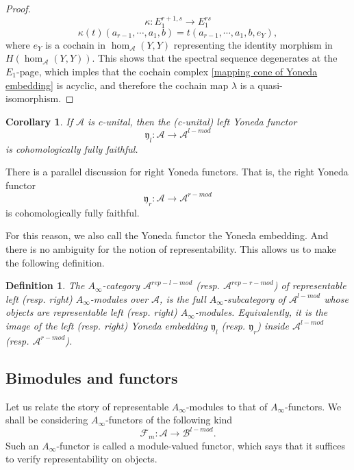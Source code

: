 \documentclass{amsart}
\newtheorem{definition}[theorem]{Definition}
\newtheorem{corollary}[theorem]{Corollary}
\numberwithin{equation}{section}
\numberwithin{figure}{section}
\begin{document}
\begin{proof}
\begin{equation}
\kappa: E_{1}^{r+1, s} \to E_{1}^{rs}
\end{equation}
\begin{equation}
\kappa(t)(a_{r-1}, \cdots, a_{1}, b) = t(a_{r-1}, \cdots, a_{1}, b, e_{Y}),
\end{equation}
where $e_{Y}$ is a cochain in $\hom_{\mathcal{A}}(Y, Y)$ representing the identity morphism in $H(\hom_{\mathcal{A}}(Y, Y))$. This shows that the spectral sequence degenerates at the $E_{1}$-page, which imples that the cochain complex \eqref{mapping cone of Yoneda embedding} is acyclic, and therefore the cochain map $\lambda$ is a quasi-isomorphism.
\end{proof}

\begin{corollary}
	If $\mathcal{A}$ is c-unital, then the (c-unital) left Yoneda functor
\begin{equation*}
\mathfrak{y}_{l}: \mathcal{A} \to \mathcal{A}^{l-mod}
\end{equation*}
is cohomologically fully faithful.
\end{corollary}

	There is a parallel discussion for right Yoneda functors. That is, the right Yoneda functor
\begin{equation*}
\mathfrak{y}_{r}: \mathcal{A} \to \mathcal{A}^{r-mod}
\end{equation*}
is cohomologically fully faithful. \par

	For this reason, we also call the Yoneda functor the Yoneda embedding. And there is no ambiguity for the notion of representability. This allows us to make the following definition. \par

\begin{definition}
	The $A_{\infty}$-category $\mathcal{A}^{rep-l-mod}$ (resp. $\mathcal{A}^{rep-r-mod}$) of representable left (resp. right) $A_{\infty}$-modules over $\mathcal{A}$, is the full $A_{\infty}$-subcategory of $\mathcal{A}^{l-mod}$ whose objects are representable left (resp. right) $A_{\infty}$-modules. Equivalently, it is the image of the left (resp. right) Yoneda embedding $\mathfrak{y}_{l}$ (resp. $\mathfrak{y}_{r}$) inside $\mathcal{A}^{l-mod}$ (resp. $\mathcal{A}^{r-mod}$).
\end{definition}

\subsection{Bimodules and functors}\label{section: bimodules and functors}
	Let us relate the story of representable $A_{\infty}$-modules to that of $A_{\infty}$-functors. We shall be considering $A_{\infty}$-functors of the following kind
\begin{equation}
\mathcal{F}_{m}: \mathcal{A} \to \mathcal{B}^{l-mod}.
\end{equation}
Such an $A_{\infty}$-functor is called a module-valued functor, which says that it suffices to verify representability on objects. \par
\end{document}
